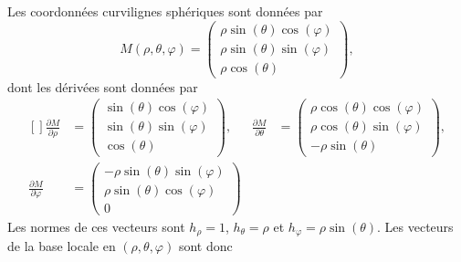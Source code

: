 Les coordonnées curvilignes sphériques sont données par
\begin{equation}
	M(\rho,\theta,\varphi)=
	\begin{pmatrix}
		\rho\sin(\theta)\cos(\varphi) \\
		\rho\sin(\theta)\sin(\varphi) \\
		\rho\cos(\theta)
	\end{pmatrix},
\end{equation}
dont les dérivées sont données par
\begin{equation}
	\begin{aligned}[]
		\frac{ \partial M }{ \partial \rho }    & =\begin{pmatrix}
			                                           \sin(\theta)\cos(\varphi) \\
			                                           \sin(\theta)\sin(\varphi) \\
			                                           \cos(\theta)
		                                           \end{pmatrix},
		                                        & \frac{ \partial M }{ \partial \theta } & =
		\begin{pmatrix}
			\rho\cos(\theta)\cos(\varphi) \\
			\rho\cos(\theta)\sin(\varphi) \\
			-\rho\sin(\theta)
		\end{pmatrix},                                                        \\
		\frac{ \partial M }{ \partial \varphi } & =
		\begin{pmatrix}
			-\rho\sin(\theta)\sin(\varphi) \\
			\rho\sin(\theta)\cos(\varphi)  \\
			0
		\end{pmatrix}
	\end{aligned}
\end{equation}
Les normes de ces vecteurs sont \( h_{\rho}=1\), \( h_{\theta}=\rho\) et \( h_{\varphi}=\rho\sin(\theta)\). Les vecteurs de la base locale en \( (\rho,\theta,\varphi)\) sont donc
